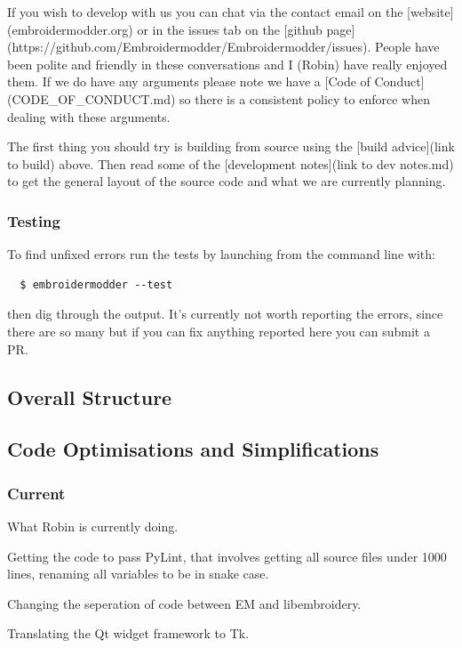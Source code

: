 \documentclass[a4paper, 11pt]{report}
\begin{document}
If you wish to develop with us you can chat via the contact email
on the [website](embroidermodder.org) or in the issues tab on the
[github page](https://github.com/Embroidermodder/Embroidermodder/issues).
People have been polite and friendly in these conversations and I (Robin)
have really enjoyed them.
If we do have any arguments please note we have a
[Code of Conduct](CODE\_OF\_CONDUCT.md) so there is a consistent policy to
enforce when dealing with these arguments.

The first thing you should try is building from source using the [build advice](link to build)
above. Then read some of the [development notes](link to dev notes.md) to get the general
layout of the source code and what we are currently planning.

\subsubsection{Testing}

To find unfixed errors run the tests by launching from the command line with:

\begin{verbatim}
  $ embroidermodder --test
\end{verbatim}

then dig through the output. It's currently not worth reporting the errors, since
there are so many but if you can fix anything reported here you can submit a PR.

\subsection{Overall Structure}

\subsection{Code Optimisations and Simplifications}

\subsubsection{Current}

What Robin is currently doing.

Getting the code to pass PyLint, that involves getting all source files
under 1000 lines, renaming all variables to be in snake case.

Changing the seperation of code between EM and libembroidery.

Translating the Qt widget framework to Tk.
\end{document}
